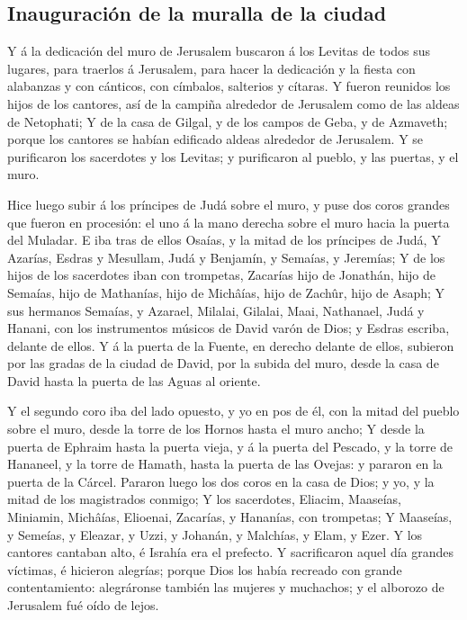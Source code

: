 \hypertarget{inauguraciuxf3n-de-la-muralla-de-la-ciudad}{%
\subsection{Inauguración de la muralla de la
ciudad}\label{inauguraciuxf3n-de-la-muralla-de-la-ciudad}}

 Y á la dedicación del muro de Jerusalem buscaron á los
Levitas de todos sus lugares, para traerlos á Jerusalem, para hacer la
dedicación y la fiesta con alabanzas y con cánticos, con címbalos,
salterios y cítaras.  Y fueron reunidos los hijos de los
cantores, así de la campiña alrededor de Jerusalem como de las aldeas de
Netophati;  Y de la casa de Gilgal, y de los campos de
Geba, y de Azmaveth; porque los cantores se habían edificado aldeas
alrededor de Jerusalem.  Y se purificaron los sacerdotes
y los Levitas; y purificaron al pueblo, y las puertas, y el muro.

 Hice luego subir á los príncipes de Judá sobre el muro,
y puse dos coros grandes que fueron en procesión: el uno á la mano
derecha sobre el muro hacia la puerta del Muladar.  E iba
tras de ellos Osaías, y la mitad de los príncipes de Judá,
 Y Azarías, Esdras y Mesullam,  Judá y
Benjamín, y Semaías, y Jeremías;  Y de los hijos de los
sacerdotes iban con trompetas, Zacarías hijo de Jonathán, hijo de
Semaías, hijo de Mathanías, hijo de Michâías, hijo de Zachûr, hijo de
Asaph;  Y sus hermanos Semaías, y Azarael, Milalai,
Gilalai, Maai, Nathanael, Judá y Hanani, con los instrumentos músicos de
David varón de Dios; y Esdras escriba, delante de ellos. 
Y á la puerta de la Fuente, en derecho delante de ellos, subieron por
las gradas de la ciudad de David, por la subida del muro, desde la casa
de David hasta la puerta de las Aguas al oriente.

 Y el segundo coro iba del lado opuesto, y yo en pos de
él, con la mitad del pueblo sobre el muro, desde la torre de los Hornos
hasta el muro ancho;  Y desde la puerta de Ephraim hasta
la puerta vieja, y á la puerta del Pescado, y la torre de Hananeel, y la
torre de Hamath, hasta la puerta de las Ovejas: y pararon en la puerta
de la Cárcel.  Pararon luego los dos coros en la casa de
Dios; y yo, y la mitad de los magistrados conmigo;  Y los
sacerdotes, Eliacim, Maaseías, Miniamin, Michâías, Elioenai, Zacarías, y
Hananías, con trompetas;  Y Maaseías, y Semeías, y
Eleazar, y Uzzi, y Johanán, y Malchías, y Elam, y Ezer. Y los cantores
cantaban alto, é Israhía era el prefecto.  Y sacrificaron
aquel día grandes víctimas, é hicieron alegrías; porque Dios los había
recreado con grande contentamiento: alegráronse también las mujeres y
muchachos; y el alborozo de Jerusalem fué oído de lejos.

